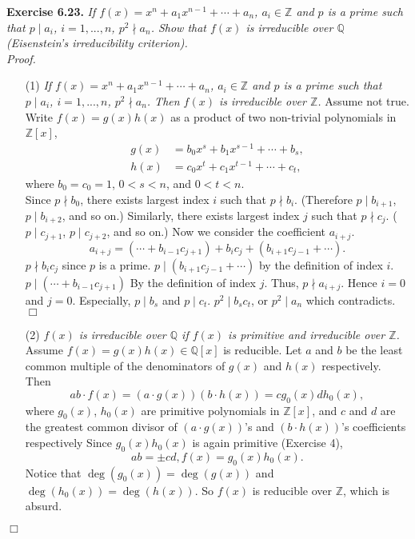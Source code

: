 \documentclass{article}
\begin{document}
\textbf{Exercise 6.23.}
\emph{If $f(x) = x^n + a_1 x^{n-1} + \cdots + a_n$, $a_i \in \mathbb{Z}$
and $p$ is a prime such that $p \mid a_i$, $i = 1, ..., n$, $p^2 \nmid a_n$.
Show that $f(x)$ is irreducible over $\mathbb{Q}$
(Eisenstein's irreducibility criterion).} \\

\emph{Proof.}
\begin{enumerate}
\item[(1)]
\emph{If $f(x) = x^n + a_1 x^{n-1} + \cdots + a_n$, $a_i \in \mathbb{Z}$
and $p$ is a prime such that $p \mid a_i$, $i = 1, ..., n$, $p^2 \nmid a_n$.
Then $f(x)$ is irreducible over $\mathbb{Z}$.}
Assume not true.
Write $f(x) = g(x)h(x)$ as a product of two non-trivial polynomials in $\mathbb{Z}[x]$,
\begin{align*}
g(x) &= b_0 x^s + b_1 x^{s-1} + \cdots + b_s, \\
h(x) &= c_0 x^t + c_1 x^{t-1} + \cdots + c_t,
\end{align*}
where $b_0 = c_0 = 1$, $0 < s < n$, and $0 < t < n$. \\

Since $p \nmid b_0$, there exists largest index $i$ such that $p \nmid b_i$.
(Therefore $p \mid b_{i+1}$, $p \mid b_{i+2}$, and so on.)
Similarly, there exists largest index $j$ such that $p \nmid c_j$.
($p \mid c_{j+1}$, $p \mid c_{j+2}$, and so on.)
Now we consider the coefficient $a_{i+j}$.
$$a_{i+j} = (\cdots + b_{i-1} c_{j+1}) + b_i c_j + (b_{i+1} c_{j-1} + \cdots).$$
$p \nmid b_i c_j$ since $p$ is a prime.
$p \mid (b_{i+1} c_{j-1} + \cdots)$ by the definition of index $i$.
$p \mid (\cdots + b_{i-1} c_{j+1})$ By the definition of index $j$.
Thus, $p \nmid a_{i+j}$.
Hence $i = 0$ and $j = 0$. Especially, $p \mid b_s$ and $p \mid c_t$.
$p^2 \mid b_s c_t$, or $p^2 \mid a_n$ which contradicts.
$\Box$
\item[(2)]
\emph{$f(x)$ is irreducible over $\mathbb{Q}$
if $f(x)$ is primitive and irreducible over $\mathbb{Z}$.}
Assume $f(x) = g(x)h(x) \in \mathbb{Q}[x]$ is reducible.
Let $a$ and $b$ be the least common multiple of the denominators of
$g(x)$ and $h(x)$ respectively.
Then
$$ab \cdot f(x) = (a \cdot g(x))(b \cdot h(x)) = c g_0(x) d h_0(x),$$
where $g_0(x)$, $h_0(x)$ are primitive polynomials in $\mathbb{Z}[x]$, and
$c$ and $d$ are the greatest common divisor of
$(a \cdot g(x))$'s and $(b \cdot h(x))$'s coefficients respectively
Since $g_0(x) h_0(x)$ is again primitive (Exercise 4),
$$ab = \pm cd, f(x) = g_0(x) h_0(x).$$
Notice that $\deg(g_0(x)) = \deg(g(x))$ and $\deg(h_0(x)) = \deg(h(x))$.
So $f(x)$ is reducible over $\mathbb{Z}$, which is absurd.
\end{enumerate}
$\Box$ \\\\
\end{document}
